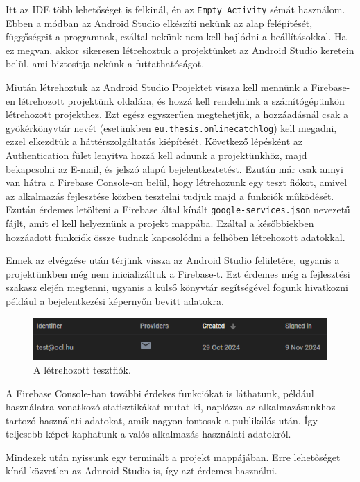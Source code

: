 Itt az IDE több lehetőséget is felkinál, én az \texttt{Empty Activity} sémát használom. Ebben a módban az Android Studio elkészíti nekünk az alap felépítését, függőségeit a programnak, ezáltal nekünk nem kell bajlódni a beállításokkal.
Ha ez megvan, akkor sikeresen létrehoztuk a projektünket az Android Studio keretein belül, ami biztosítja nekünk a futtathatóságot.

Miután létrehoztuk az Android Studio Projektet vissza kell mennünk a Firebase-en létrehozott projektünk oldalára, és hozzá kell rendelnünk a számítógépünkön létrehozott projekthez.
Ezt egész egyszerűen megtehetjük, a hozzáadásnál csak a gyökérkönyvtár nevét (esetünkben
\texttt{eu.thesis.onlinecatchlog}) kell megadni, ezzel elkezdtük a háttérszolgáltatás kiépítését.
Következő lépésként az Authentication fület lenyitva hozzá kell adnunk a projektünkhöz, majd bekapcsolni az E-mail, és jelszó alapú bejelentkeztetést. Ezután már csak annyi van hátra a Firebase Console-on belül, hogy létrehozunk egy teszt fiókot, amivel az alkalmazás fejlesztése közben tesztelni tudjuk majd a funkciók működését.
Ezután érdemes letölteni a Firebase által kínált \texttt{google-services.json} nevezetű fájlt, amit el kell helyeznünk a projekt mappába. Ezáltal a későbbiekben hozzáadott funkciók össze tudnak kapcsolódni a felhőben létrehozott adatokkal.

Ennek az elvégzése után térjünk vissza az Android Studio felületére, ugyanis a projektünkben még nem inicializáltuk a Firebase-t. Ezt érdemes még a fejlesztési szakasz elején megtenni, ugyanis a külső könyvtár segítségével fogunk hivatkozni például a bejelentkezési képernyőn bevitt adatokra.

\begin{figure}[h]
\centering
\includegraphics[scale=1]{images/firebaseloginadd.png}
\caption{A létrehozott tesztfiók.}
\label{fig:firebaseloginadd}
\end{figure}

A Firebase Console-ban további érdekes funkciókat is láthatunk, például használatra vonatkozó statisztikákat mutat ki, naplózza az alkalmazásunkhoz tartozó használati adatokat, amik nagyon fontosak a publikálás után. Így teljesebb képet kaphatunk a valós alkalmazás használati adatokról.

Mindezek után nyissunk egy terminált a projekt mappájában. Erre lehetőséget kínál közvetlen az Adnroid Studio is, így azt érdemes használni.

